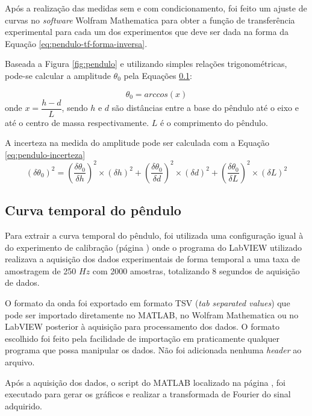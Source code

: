 \documentclass[a4paper]{instrumentacao}
\begin{document}
Após a realização das medidas sem e com condicionamento, foi feito um ajuste de curvas no \textit{software} Wolfram Mathematica para obter a função de transferência experimental para cada um dos experimentos que deve ser dada na forma da Equação \ref{eq:pendulo-tf-forma-inversa}.

Baseada  a Figura \ref{fig:pendulo} e  utilizando simples relações trigonométricas, pode-se calcular a amplitude $\theta_{0}$ pela Equações \ref{}:

\begin{equation}
	\theta_{0} = arccos(x)
	\label{eq:pendulo-angulo0}
\end{equation}
\noindent onde $x = \dfrac{h-d}{L}$, sendo $h$ e $d$ são distâncias entre a base do pêndulo até o eixo e até o centro de massa respectivamente. $L$ é o comprimento do pêndulo.

A incerteza na medida do amplitude pode ser calculada com a Equação \ref{eq:pendulo-incerteza}
\begin{equation}
	(\delta\theta_{0})^2 = (\dfrac{\delta\theta_{0}}{\delta h})^2 \times (\delta h)^2 + (\dfrac{\delta\theta_{0}}{\delta d})^2 \times (\delta d)^2 + (\dfrac{\delta\theta_{0}}{\delta L})^2 \times (\delta L)^2
	\label{eq:pendulo-incerteza}
\end{equation}


\subsection{Curva temporal do pêndulo}

Para extrair a curva temporal do pêndulo, foi utilizada uma configuração igual à do experimento de calibração (página \pageref{sec:pendulo-calibracao-condicionado}) onde o programa do LabVIEW utilizado realizava a aquisição dos dados experimentais de forma temporal a uma taxa de amostragem de 250 $Hz$ com 2000 amostras, totalizando 8 segundos de aquisição de dados.

O formato da onda foi exportado em formato TSV (\textit{tab separated values}) que pode ser importado diretamente no MATLAB, no Wolfram Mathematica ou no LabVIEW posterior à aquisição para processamento dos dados. O formato escolhido foi feito pela facilidade de importação em praticamente qualquer programa que possa manipular os dados. Não foi adicionada nenhuma \textit{header} ao arquivo.

Após a aquisição dos dados, o script do MATLAB localizado na página , foi executado para gerar os gráficos e realizar a transformada de Fourier do sinal adquirido.
\end{document}
